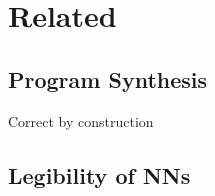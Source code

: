 
\section{Related}

\subsection{Program Synthesis}
Correct by construction

\subsection{Legibility of NNs}

